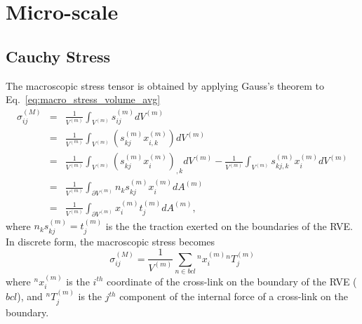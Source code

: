 \section{Micro-scale}
%
\subsection{Cauchy Stress}
%
The macroscopic stress tensor is obtained by applying Gauss's theorem to Eq.\ \eqref{eq:macro_stress_volume_avg}
%
\begin{eqnarray}
\sigma_{ij}^{(M)} &=& \frac{1}{V^{(m)}} \int_{V^{(m)}} s_{ij}^{(m)} dV^{(m)} \nonumber\\
%
&=& \frac{1}{V^{(m)}} \int_{V^{(m)}} (s_{kj}^{(m)} x_{i,k}^{(m)}) dV^{(m)} \nonumber\\
%
&=& \frac{1}{V^{(m)}} \int_{V^{(m)}} (s_{kj}^{(m)} x_i^{(m)})_{,k}dV^{(m)} - \frac{1}{V^{(m)}}\int_{V^{(m)}} s_{kj,k}^{(m)} x_i^{(m)} dV^{(m)} \nonumber\\
%
&=& \frac{1}{V^{(m)}} \int_{\partial V^{(m)}} n_k s_{kj}^{(m)} x_i^{(m)} dA^{(m)} \nonumber\\
%
&=& \frac{1}{V^{(m)}} \int_{\partial V^{(m)}} x_i^{(m)} t_j^{(m)} dA^{(m)},
\label{eq:macro_stress_gauss_thm}
\end{eqnarray}
%
where $n_k s_{kj}^{(m)} = t_j^{(m)}$ is the the traction exerted on the boundaries of the RVE. In discrete form, the macroscopic stress becomes
%
\begin{equation}
\sigma_{ij}^{(M)} = \frac{1}{V^{(m)}} \sum_{n \in bcl} {}^n x_i^{(m)} {}^n T_j^{(m)} 
\label{eq:macro_stress_discrete}
\end{equation}
%
where ${}^nx_i^{(m)}$ is the $i^{th}$ coordinate of the cross-link on the boundary of the RVE ($bcl$), and ${}^nT_j^{(m)}$ is the $j^{th}$ component of the internal force of a cross-link on the boundary. 
%
